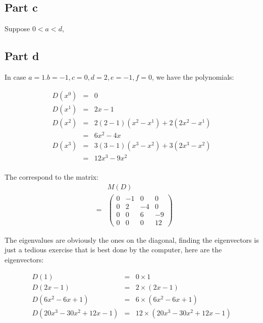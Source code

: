 \subsection*{Part c}
Suppose $ 0 < a < d $, 

\subsection*{Part d}
In case $ a = 1. b = -1, c = 0, d = 2, e = -1, f = 0 $, we have the polynomials:

\begin{eqnarray*}
  D(x^0) &=& 0 \\
  D(x^1) &=& 2x - 1 \\
  D(x^2) &=& 2(2-1)(x^2 - x^1) + 2(2x^2 - x^1) \\
         &=& 6x^2 - 4x \\
  D(x^3) &=& 3(3-1)(x^3 - x^2) + 3(2x^3 - x^2) \\
        &=& 12x^3 - 9x^2 \\
\end{eqnarray*}

The correspond to the matrix:
\begin{eqnarray*}
  & & M(D) \\
  &=& \left(\begin{array}{cccc}
    0 & -1 &  0 & 0  \\
    0 & 2  & -4 & 0  \\
    0 & 0  &  6 & -9 \\
    0 & 0  &  0 & 12
      \end{array}\right)
\end{eqnarray*}

The eigenvalues are obviously the ones on the diagonal, finding the eigenvectors is just a tedious exercise that is best done by the computer, here are the eigenvectors:

\begin{eqnarray*}
  D(1) &=& 0 \times 1 \\
  D(2x - 1) &=& 2 \times (2x - 1) \\
  D(6x^2 - 6x + 1) &=& 6 \times (6x^2 - 6x + 1) \\
  D(20x^3 - 30x^2 + 12x - 1) &=& 12 \times (20x^3 - 30x^2 + 12x - 1)
\end{eqnarray*}